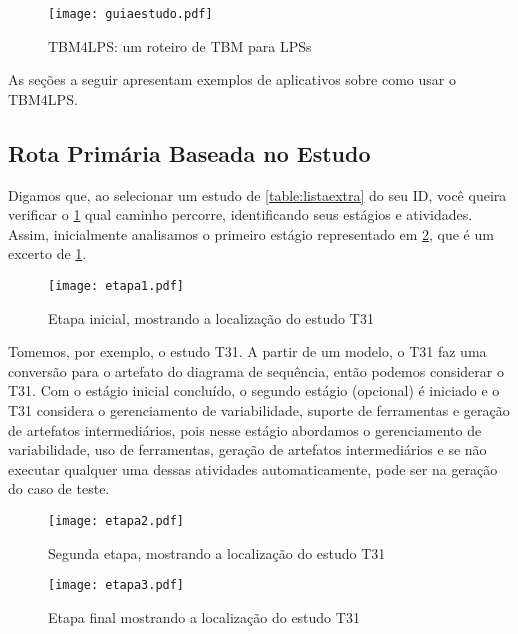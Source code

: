 \begin{tiny}
	\begin{landscape}	
		\begin{figure}[!ht]
			\centering
			\texttt{[image: guiaestudo.pdf]}
			\caption{TBM4LPS: um roteiro de TBM para LPSs}
			\label{fig:guiaestudo}
		\end{figure}	
	\end{landscape}
\end{tiny}

As seções a seguir apresentam exemplos de aplicativos sobre como usar o TBM4LPS.

\subsection{Rota Primária Baseada no Estudo}

Digamos que, ao selecionar um estudo de \ref{table:listaextra} do seu ID, você queira verificar o \ref{fig:guiaestudo} qual caminho percorre, identificando seus estágios e atividades. Assim, inicialmente analisamos o primeiro estágio representado em \ref{fig:estagio1}, que é um excerto de \ref{fig:guiaestudo}.

\begin{figure}[!ht]
	\centering
	\texttt{[image: etapa1.pdf]}
	\caption{Etapa inicial, mostrando a localização do estudo T31}
	\label{fig:estagio1}
\end{figure}

Tomemos, por exemplo, o estudo T31. A partir de um modelo, o T31 faz uma conversão para o artefato do diagrama de sequência, então podemos considerar o T31. Com o estágio inicial concluído, o segundo estágio (opcional) é iniciado e o T31 considera o gerenciamento de variabilidade, suporte de ferramentas e geração de artefatos intermediários, pois nesse estágio abordamos o gerenciamento de variabilidade, uso de ferramentas, geração de artefatos intermediários e se não executar qualquer uma dessas atividades automaticamente, pode ser na geração do caso de teste.

\begin{figure}[!ht]
	\centering
	\texttt{[image: etapa2.pdf]}
	\caption{Segunda etapa, mostrando a localização do estudo T31}
	\label{fig:estagio2}
\end{figure}

\begin{figure}[!ht]
	\centering
	\texttt{[image: etapa3.pdf]}
	\caption{Etapa final mostrando a localização do estudo T31}
	\label{fig:estagio3}
\end{figure}

